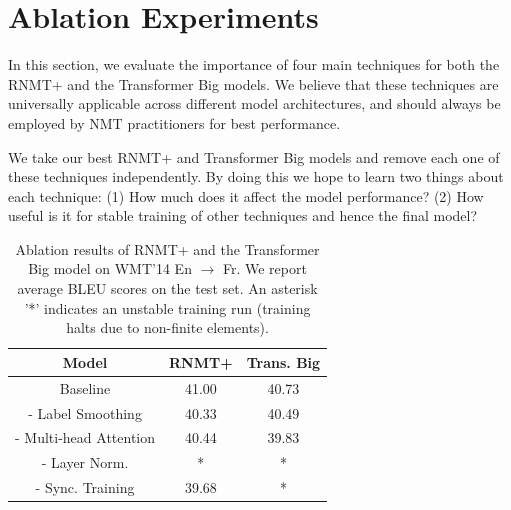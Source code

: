 \documentclass[11pt,a4paper]{article}
\begin{document}
\vspace{-10px}
\section{Ablation Experiments}

In this section, we evaluate the importance of four main techniques
for both the RNMT+ and the Transformer Big models. We believe that these
techniques are universally applicable across different model
architectures, and should always be employed by NMT practitioners for
best performance.

We take our best RNMT+ and
Transformer Big models and remove each one of these techniques
independently. By doing this we hope to learn two things about each
technique: (1) How much does it affect the model performance? (2) How useful is
it for stable training of other techniques and hence the final model?

\begin{table}[!htbp]
\centering
\begin{tabular}{c|c|c}
 \hline
 \hline
 Model & RNMT+ & Trans. Big \\
 \hline
Baseline & 41.00 & 40.73\\
- Label Smoothing & 40.33 & 40.49\\
- Multi-head Attention & 40.44 & 39.83\\
- Layer Norm. & * & *\\
- Sync. Training & 39.68 & *\\
 \hline
\end{tabular}
\caption{Ablation results of RNMT+ and the Transformer Big model on WMT'14
En $\rightarrow$ Fr. We report average BLEU
scores on the test set. An asterisk '\mbox{*}' indicates an unstable training run
(training halts due to non-finite elements).}
\label{table:enfr_ablation}
\end{table}
\end{document}
